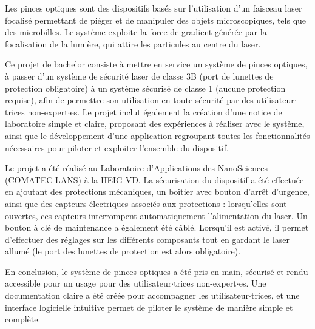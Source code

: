 Les pinces optiques sont des dispositifs basés sur l'utilisation d'un faisceau laser focalisé permettant de piéger et de manipuler des objets microscopiques, tels que des microbilles. Le système exploite la force de gradient générée par la focalisation de la lumière, qui attire les particules au centre du laser.

Ce projet de bachelor consiste à mettre en service un système de pinces optiques, à passer d'un système de sécurité laser de classe 3B (port de lunettes de protection obligatoire) à un système sécurisé de classe 1 (aucune protection requise), afin de permettre son utilisation en toute sécurité par des utilisateur\(\cdot\)trices non-expert\(\cdot\)es. Le projet inclut également la création d'une notice de laboratoire simple et claire, proposant des expériences à réaliser avec le système, ainsi que le développement d'une application regroupant toutes les fonctionnalités nécessaires pour piloter et exploiter l'ensemble du dispositif.

Le projet a été réalisé au Laboratoire d'Applications des NanoSciences (COMATEC-LANS) à la HEIG-VD. La sécurisation du dispositif a été effectuée en ajoutant des protections mécaniques, un boîtier avec bouton d'arrêt d'urgence, ainsi que des capteurs électriques associés aux protections : lorsqu'elles sont ouvertes, ces capteurs interrompent automatiquement l'alimentation du laser. Un bouton à clé de maintenance a également été câblé. Lorsqu'il est activé, il permet d'effectuer des réglages sur les différents composants tout en gardant le laser allumé (le port des lunettes de protection est alors obligatoire).

En conclusion, le système de pinces optiques a été pris en main, sécurisé et rendu accessible pour un usage pour des utilisateur\(\cdot\)trices non-expert\(\cdot\)es. Une documentation claire a été créée pour accompagner les utilisateur\(\cdot\)trices, et une interface logicielle intuitive permet de piloter le système de manière simple et complète.




